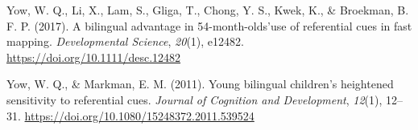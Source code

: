 \documentclass[english,,man,floatsintext]{apa6}
\begin{document}
\leavevmode\hypertarget{ref-Yow_etal_2017}{}%
Yow, W. Q., Li, X., Lam, S., Gliga, T., Chong, Y. S., Kwek, K., \& Broekman, B. F. P. (2017). A bilingual advantage in 54-month-olds'use of referential cues in fast mapping. \emph{Developmental Science}, \emph{20}(1), e12482. \url{https://doi.org/10.1111/desc.12482}

\leavevmode\hypertarget{ref-Yow_Markman_2011}{}%
Yow, W. Q., \& Markman, E. M. (2011). Young bilingual children's heightened sensitivity to referential cues. \emph{Journal of Cognition and Development}, \emph{12}(1), 12--31. \url{https://doi.org/10.1080/15248372.2011.539524}

\endgroup
\end{document}
